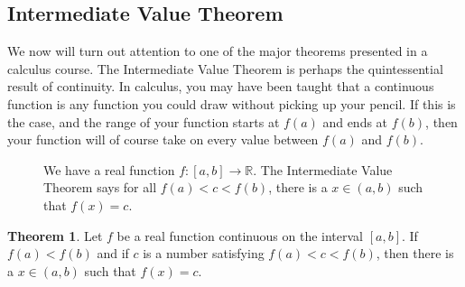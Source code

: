 \documentclass{article}
\newcommand{\R}{\mathbb{R}}
\theoremstyle{definition}
\newtheorem{theorem}{Theorem}[section]
\begin{document}
	\subsection{Intermediate Value Theorem}
	We now will turn out attention to one of the major theorems presented in a calculus course. The Intermediate Value Theorem is perhaps the quintessential result of continuity. In calculus, you may have been taught that a continuous function is any function you could draw without picking up your pencil. If this is the case, and the range of your function starts at $ f(a) $ and ends at $ f(b) $, then your function will of course take on every value between $ f(a) $ and $ f(b) $.  
	\begin{figure}[h!]
		\centering
		\caption{We have a real function $ f:[a,b]\to\R $. The Intermediate Value Theorem says for all $f(a)< c<f(b) $, there is a $ x\in(a,b) $ such that $ f(x)=c $.}
	\end{figure}
	\begin{theorem}
		Let $ f $ be a real function continuous on the interval $ [a,b] $. If $ f(a)<f(b) $ and if $ c $ is a number satisfying $f(a)< c<f(b) $, then there is a $ x\in(a,b) $ such that $ f(x)=c $.
	\end{theorem}
\end{document}
